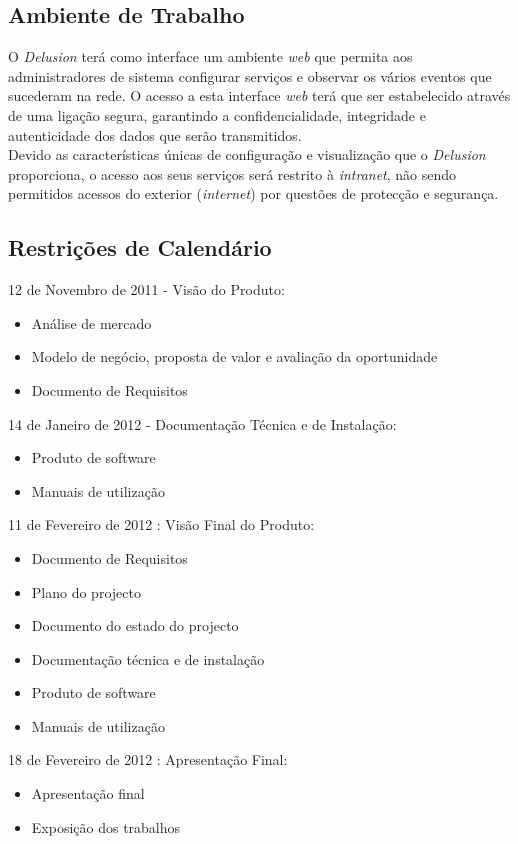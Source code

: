 \subsection{Ambiente de Trabalho}

    O \textit{Delusion} terá como interface um ambiente \textit{web} que permita aos administradores de sistema configurar serviços e observar os vários eventos que sucederam na rede. O acesso a esta interface \textit{web} terá que ser estabelecido através de uma ligação segura, garantindo a confidencialidade, integridade e autenticidade dos dados que serão transmitidos.\\

    Devido as características únicas de configuração e visualização que o \textit{Delusion} proporciona, o acesso aos seus serviços será restrito à \textit{intranet}, não sendo permitidos acessos do exterior (\textit{internet}) por questões de protecção e segurança.

\subsection{Restrições de Calendário}
\begin{description}
    \item 12 de Novembro de 2011 - Visão do Produto: 
        \begin{itemize}
            \item Análise de mercado
            \item Modelo de negócio, proposta de valor e avaliação da oportunidade
            \item Documento de Requisitos
        \end{itemize}
    \item 14 de Janeiro de 2012 - Documentação Técnica e de Instalação: 
        \begin{itemize}
            \item Produto de software
            \item Manuais de utilização
        \end{itemize}
    \item 11 de Fevereiro de 2012 : Visão Final do Produto:
        \begin{itemize}
            \item Documento de Requisitos
            \item Plano do projecto
            \item Documento do estado do projecto
            \item Documentação técnica e de instalação
            \item Produto de software
            \item Manuais de utilização
        \end{itemize}
    \item 18 de Fevereiro de 2012 : Apresentação Final: 
        \begin{itemize}
            \item Apresentação final
            \item Exposição dos trabalhos
        \end{itemize}
\end{description}


